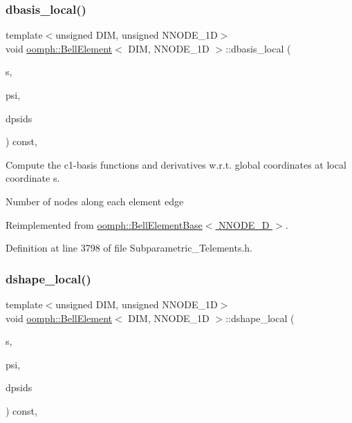 \subsubsection{\texorpdfstring{dbasis\+\_\+local()}{dbasis\_local()}}
{\footnotesize\ttfamily template$<$unsigned D\+IM, unsigned N\+N\+O\+D\+E\+\_\+1D$>$ \\
void \hyperlink{classoomph_1_1BellElement}{oomph\+::\+Bell\+Element}$<$ D\+IM, N\+N\+O\+D\+E\+\_\+1D $>$\+::dbasis\+\_\+local (\begin{DoxyParamCaption}\item[{const \hyperlink{classoomph_1_1Vector}{Vector}$<$ double $>$ \&}]{s,  }\item[{\hyperlink{classoomph_1_1Shape}{Shape} \&}]{psi,  }\item[{\hyperlink{classoomph_1_1DShape}{D\+Shape} \&}]{dpsids }\end{DoxyParamCaption}) const\hspace{0.3cm}{\ttfamily [inline]}, {\ttfamily [virtual]}}



Compute the c1-\/basis functions and derivatives w.\+r.\+t. global coordinates at local coordinate s. 

Number of nodes along each element edge 

Reimplemented from \hyperlink{classoomph_1_1BellElementBase_a02f75fd57e4f6329a4b551df3d3c81eb}{oomph\+::\+Bell\+Element\+Base$<$ N\+N\+O\+D\+E\+\_\+D $>$}.



Definition at line 3798 of file Subparametric\+\_\+\+Telements.\+h.

\mbox{\label{classoomph_1_1BellElement_a3aba354751518a5f1bfe95c531e3d464}} 
\subsubsection{\texorpdfstring{dshape\+\_\+local()}{dshape\_local()}}
{\footnotesize\ttfamily template$<$unsigned D\+IM, unsigned N\+N\+O\+D\+E\+\_\+1D$>$ \\
void \hyperlink{classoomph_1_1BellElement}{oomph\+::\+Bell\+Element}$<$ D\+IM, N\+N\+O\+D\+E\+\_\+1D $>$\+::dshape\+\_\+local (\begin{DoxyParamCaption}\item[{const \hyperlink{classoomph_1_1Vector}{Vector}$<$ double $>$ \&}]{s,  }\item[{\hyperlink{classoomph_1_1Shape}{Shape} \&}]{psi,  }\item[{\hyperlink{classoomph_1_1DShape}{D\+Shape} \&}]{dpsids }\end{DoxyParamCaption}) const\hspace{0.3cm}{\ttfamily [inline]}, {\ttfamily [virtual]}}



